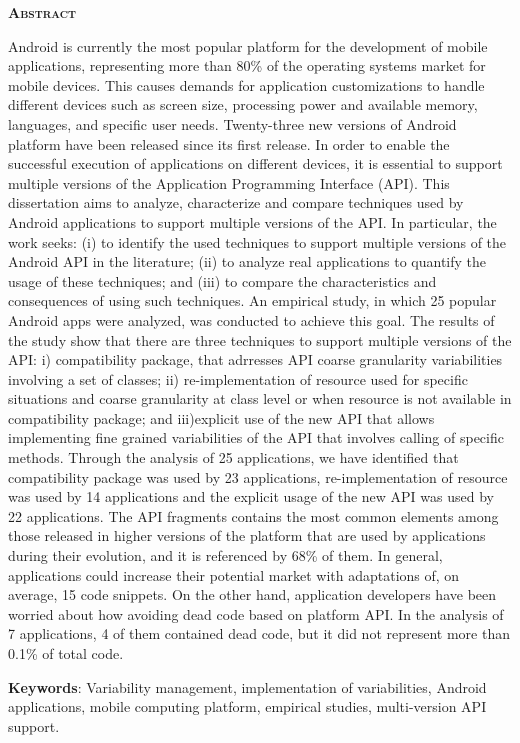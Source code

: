 
\begin{center}
	\Large{\textsc{\textbf{Abstract}}}
\end{center}

\noindent Android is currently the most popular platform for the development
of mobile applications, representing more than 80\% of the operating systems market
for mobile devices. This causes demands for application customizations to handle
different devices such as screen size, processing power and available memory, languages,
and specific user needs. Twenty-three new versions of Android platform have been
released since its first release. In order to enable the successful execution of
applications on different devices, it is essential to support multiple versions of
the Application Programming Interface (API). This dissertation aims to analyze,
characterize and compare techniques used by Android applications to support multiple
versions of the API. In particular, the work seeks: (i) to identify the used techniques
to support multiple versions of the Android API in the literature; (ii) to analyze real
applications to quantify the usage of these techniques; and (iii) to compare the
characteristics and consequences of using such techniques. An empirical study, in which
25 popular Android apps were analyzed, was conducted to achieve this goal. The results
of the study show that there are three techniques to support multiple versions of the
API:
i) compatibility package, that adrresses API coarse granularity variabilities involving
a set of classes; 
ii) re-implementation of resource used for specific situations and coarse granularity
at class level or when resource is not available in compatibility package; and
iii)explicit use of the new API that allows implementing fine grained variabilities of the
API that involves
calling of specific methods. Through the analysis of 25 applications, we have identified
that compatibility package was used by 23 applications, re-implementation of resource was
used by 14 applications and the explicit usage of the new API was used by 22 applications.
The API fragments contains the most common elements among those released in higher versions
of the platform that are used by applications during their evolution, and it is referenced
by 68\% of them. In general, applications could increase their potential market with adaptations
of, on average, 15 code snippets. On the other hand, application developers have been worried
about how avoiding dead code based on platform API. In the analysis of 7 applications, 4 of
them contained dead code, but it did not represent more than 0.1\% of total code.

\noindent\textbf{Keywords}:  Variability management, implementation of variabilities,
Android applications, mobile computing platform, empirical studies, multi-version API support.
